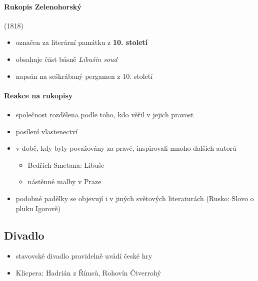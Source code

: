 \paragraph{Rukopis Zelenohorský} (1818)
\begin{itemize}
\item označen za literární památku z \textbf{10. století}
\item obsahuje část básně \textit{Libušin soud}
\item napsán na seškrábaný pergamen z 10. století
\end{itemize}

\paragraph{Reakce na rukopisy}
\begin{itemize}
\item společnost rozdělena podle toho, kdo věřil v jejich pravost
\item posílení vlastenectví
\item v době, kdy byly považovány za pravé, inspirovali mnoho dalších autorů
	\begin{itemize}
	\item Bedřich Smetana: Libuše
	\item nástěnné malby v Praze
	\end{itemize}
\item podobné padělky se objevují i v jiných světových literaturách (Rusko: Slovo o pluku Igorově)
\end{itemize}

\subsection{Divadlo}
\begin{itemize}
\item stavovské divadlo pravidelně uvádí české hry
\item Klicpera: Hadrián z Římsů, Rohovín Čtverrohý 
\end{itemize}




